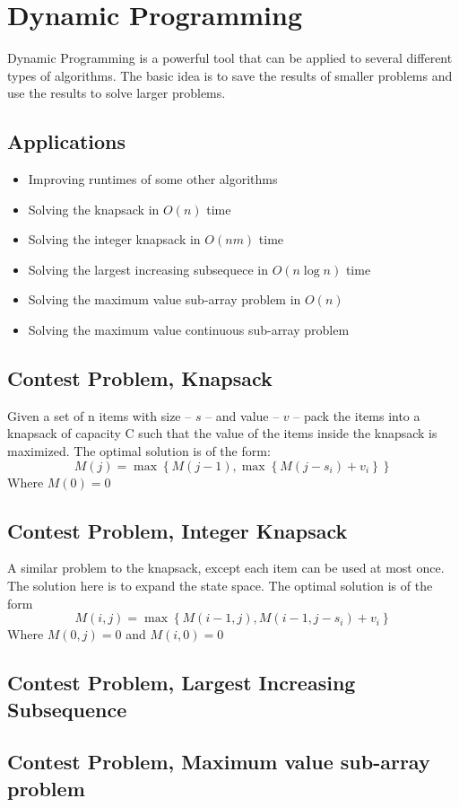 \section{Dynamic Programming}
Dynamic Programming is a powerful tool that can be applied to several different types of algorithms.\cite{dppractice}
The basic idea is to save the results of smaller problems and use the results to solve larger problems.

\subsection{Applications}
\begin{itemize}
	\item	Improving runtimes of some other algorithms
	\item	Solving the knapsack in $O(n)$ time
	\item	Solving the integer knapsack in $O(nm)$ time
	\item	Solving the largest increasing subsequece in $O(n \log n)$ time
	\item	Solving the maximum value sub-array problem in $O(n)$
	\item	Solving the maximum value continuous sub-array problem
\end{itemize}

\subsection{Contest Problem, Knapsack}
Given a set of n items with size -- $s$ -- and value -- $v$ -- pack the items into a knapsack of capacity C such that the value of the items inside the knapsack is maximized.  The optimal solution is of the form:
$$M(j) = \max \left\{M(j-1), \max \left\{M(j - s_i) + v_i \right\}\right\}$$
Where $M(0) = 0$


\subsection{Contest Problem, Integer Knapsack}
A similar problem to the knapsack, except each item can be used at most once.  The solution here is to expand the state space.  The optimal solution is of the form
$$M(i,j) = \max \left\{ M(i-1, j) , M(i-1, j- s_i) + v_i \right\}$$
Where $M(0,j) = 0$ and $M(i,0) = 0$


\subsection{Contest Problem, Largest Increasing Subsequence}
\subsection{Contest Problem, Maximum value sub-array problem}
